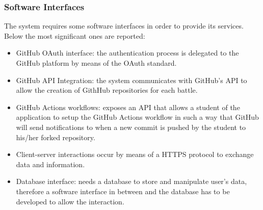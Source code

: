 \subsubsection{Software Interfaces}
The system requires some software interfaces in order to provide its services. Below the most significant ones are reported:
\begin{itemize}
	\item GitHub OAuth interface: the authentication process is delegated to the GitHub platform by means of the OAuth standard.
    \item GitHub API Integration: the system communicates with GitHub's API to allow the creation of GithHub repositories for each battle.
    \item GitHub Actions workflows: \app exposes an API that allows a student of the application to setup the GitHub Actions workflow in such a way that GitHub will send notifications to \app when a new commit is pushed by the student to his/her forked repository.
    \item Client-server interactions occur by means of a HTTPS protocol to exchange data and information.
    \item Database interface: \app needs a database to store and manipulate user's data, therefore a software interface in between \app and the database has to be developed to allow the interaction.
\end{itemize}